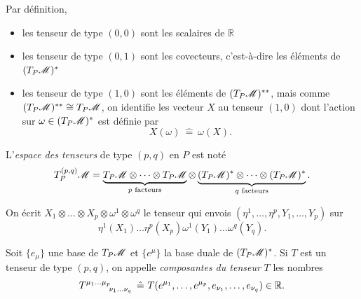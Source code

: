 \documentclass[a4paper,11pt]{report}
\begin{document}
                Par définition,
                \begin{itemize}[label = \textbullet]
                    \item les tenseur de type $(0,0)$ sont les scalaires de $\mathbb{R}$
                    \item les tenseur de type $(0,1)$ sont les covecteurs, c'est-à-dire les éléments de $(T_P\mathscr{M})^*$
                    \item les tenseur de type $(1,0)$ sont les éléments de $(T_P\mathscr{M})^{**}$, mais comme $(T_P\mathscr{M})^{**}\cong T_P\mathscr{M}$, on identifie les vecteur $X$ au tenseur $(1,0)$ dont l'action sur $\omega\in(T_P\mathscr{M})^*$ est définie par
                    \begin{equation}
                        X(\omega)~\hat{=}~\omega(X).
                    \end{equation}
                \end{itemize}
                
                \begin{defn}
                    L'\textit{espace des tenseurs} de type $(p,q)$ en $P$ est noté
                    \begin{equation}
                        T^{(p,q)}_P\mathscr{M} = \underbrace{T_P\mathscr{M}\otimes\dots\otimes T_P\mathscr{M}}_{\text{$p$ facteurs}}\otimes \underbrace{(T_P\mathscr{M})^*\otimes\dots\otimes (T_P\mathscr{M})^*}_{\text{$q$ facteurs}}.
                    \end{equation}
                \end{defn}
                
                On écrit $X_1\otimes\dots\otimes X_p\otimes\omega^1\otimes\omega^q$ le tenseur qui envois $(\eta^1,\dots,\eta^p,Y_1,\dots,Y_p)$ sur
                \begin{equation}
                    \eta^1(X_1)\dots\eta^p(X_p)\omega^1(Y_1)\dots\omega^q(Y_q).
                \end{equation}
                
                \begin{defn}
                    Soit $\{e_\mu\}$ une base de $T_P\mathscr{M}$ et $\{e^\mu\}$ la base duale de $(T_P\mathscr{M})^*$. Si $T$ est un tenseur de type $(p,q)$, on appelle \textit{composantes du tenseur} $T$ les nombres
                    \begin{equation}
                        T\indices{^{\mu_1\dots\mu_p}_{\nu_1\dots\nu_q}}~\hat{=}~T(e^{\mu_1},\dots,e^{\mu_p},e_{\nu_1},\dots,e_{\nu_q})\in\mathbb{R}.
                    \end{equation}
                \end{defn}
                
\end{document}
